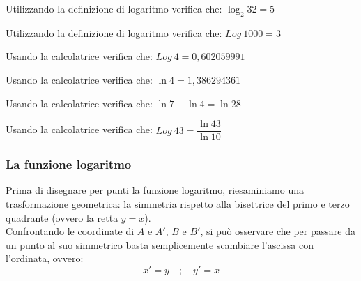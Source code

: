 \begin{esempio}
 Utilizzando la definizione di logaritmo verifica che: \(\log_2 32 = 5\)
\end{esempio}

\begin{esempio}
 Utilizzando la definizione di logaritmo verifica che: \(Log~1000 = 3\)
\end{esempio}

\begin{esempio}
 Usando la calcolatrice verifica che: \(Log~4 = 0,602059991\)
\end{esempio}

\begin{esempio}
 Usando la calcolatrice verifica che: \(\ln 4 = 1,386294361\)
\end{esempio}

\begin{esempio}
 Usando la calcolatrice verifica che: \(\ln 7 + \ln 4 = \ln 28\)
\end{esempio}

\begin{esempio}
 Usando la calcolatrice verifica che: \(Log~43 = \dfrac{\ln 43}{\ln 10}\)
\end{esempio}

\subsubsection{La funzione logaritmo}
\label{subsubsec:esplog_funzione_logaritmo}
\noindent
\begin{minipage}[]{.60\textwidth}
Prima di disegnare per punti la funzione logaritmo, riesaminiamo una 
trasformazione geometrica: la simmetria rispetto alla bisettrice del primo e terzo quadrante (ovvero
la retta $y=x$).\\[7pt]
Confrontando le coordinate di $A$ e $A'$, $B$ e $B'$, si può osservare che per 
passare da un punto al suo simmetrico basta semplicemente scambiare l'ascissa 
con l'ordinata, ovvero:
\[ x'=y \quad ; \quad  y'=x\]


\end{minipage} \hspace{.04\textwidth}
\begin{minipage}[]{.35\textwidth}
\begin{center}
\begin{inaccessibleblock}
  \simmetriayx
\end{inaccessibleblock}
\end{center}
\end{minipage} 

